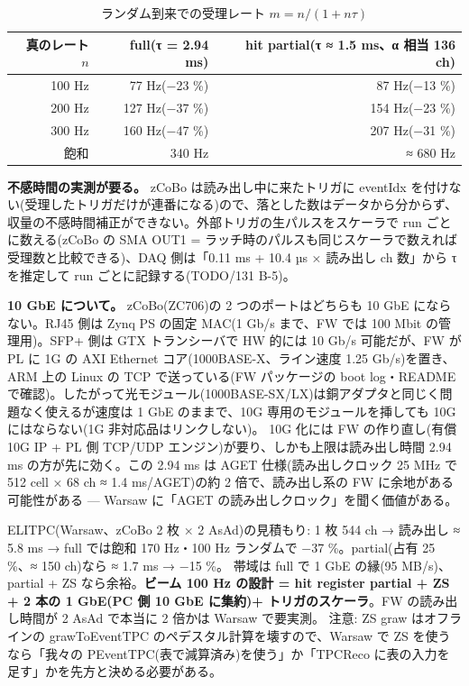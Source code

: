 \documentclass[a4paper,11pt]{ltjsarticle}
\begin{document}
\begin{table}[h]\centering\small
\caption{ランダム到来での受理レート $m = n/(1+n\tau)$}
\label{tab:deadtime}
\begin{tabular}{rrr}
\toprule
真のレート $n$ & full(τ = 2.94 ms) & hit partial(τ ≈ 1.5 ms、α 相当 136 ch) \\
\midrule
100 Hz & 77 Hz(−23 \%) & 87 Hz(−13 \%) \\
200 Hz & 127 Hz(−37 \%) & 154 Hz(−23 \%) \\
300 Hz & 160 Hz(−47 \%) & 207 Hz(−31 \%) \\
飽和 & 340 Hz & ≈ 680 Hz \\
\bottomrule
\end{tabular}
\end{table}

\textbf{不感時間の実測が要る。} zCoBo は読み出し中に来たトリガに eventIdx を付けない(受理したトリガだけが連番になる)ので、落とした数はデータから分からず、収量の不感時間補正ができない。外部トリガの生パルスをスケーラで run ごとに数える(zCoBo の SMA OUT1 = ラッチ時のパルスも同じスケーラで数えれば受理数と比較できる)、DAQ 側は「0.11 ms + 10.4 µs × 読み出し ch 数」から τ を推定して run ごとに記録する(TODO/131 B-5)。

\textbf{10 GbE について。} zCoBo(ZC706)の 2 つのポートはどちらも 10 GbE にならない。RJ45 側は Zynq PS の固定 MAC(1 Gb/s まで、FW では 100 Mbit の管理用)。SFP+ 側は GTX トランシーバで HW 的には 10 Gb/s 可能だが、FW が PL に 1G の AXI Ethernet コア(1000BASE-X、ライン速度 1.25 Gb/s)を置き、ARM 上の Linux の TCP で送っている(FW パッケージの boot log・README で確認)。したがって光モジュール(1000BASE-SX/LX)は銅アダプタと同じく問題なく使えるが速度は 1 GbE のままで、10G 専用のモジュールを挿しても 10G にはならない(1G 非対応品はリンクしない)。
10G 化には FW の作り直し(有償 10G IP + PL 側 TCP/UDP エンジン)が要り、しかも上限は読み出し時間 2.94 ms の方が先に効く。この 2.94 ms は AGET 仕様(読み出しクロック 25 MHz で 512 cell × 68 ch ≈ 1.4 ms/AGET)の約 2 倍で、読み出し系の FW に余地がある可能性がある — Warsaw に「AGET の読み出しクロック」を聞く価値がある。

ELITPC(Warsaw、zCoBo 2 枚 × 2 AsAd)の見積もり: 1 枚 544 ch → 読み出し ≈ 5.8 ms → full では飽和 170 Hz・100 Hz ランダムで −37 \%。partial(占有 25 \%、≈ 150 ch)なら ≈ 1.7 ms → −15 \%。
帯域は full で 1 GbE の縁(95 MB/s)、partial + ZS なら余裕。\textbf{ビーム 100 Hz の設計 = hit register partial + ZS + 2 本の 1 GbE(PC 側 10 GbE に集約)+ トリガのスケーラ}。FW の読み出し時間が 2 AsAd で本当に 2 倍かは Warsaw で要実測。
注意: ZS graw はオフラインの grawToEventTPC のペデスタル計算を壊すので、Warsaw で ZS を使うなら「我々の PEventTPC(表で減算済み)を使う」か「TPCReco に表の入力を足す」かを先方と決める必要がある。
\end{document}
